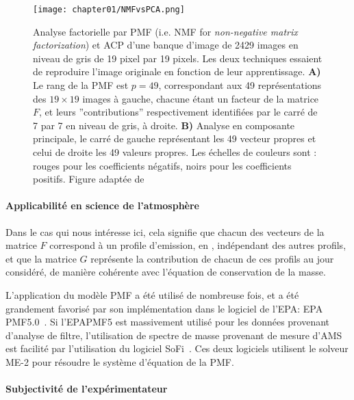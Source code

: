 \begin{figure}[ht]
    \centering
    \texttt{[image: chapter01/NMFvsPCA.png]}
    \caption{Analyse factorielle par PMF (i.e. NMF for \textit{non-negative matrix
    factorization}) et ACP d'une banque d'image de 2429 images en niveau de gris de 19
    pixel par 19 pixels. Les deux techniques essaient de reproduire l'image originale en
    fonction de leur apprentissage.
    \textbf{A)} Le rang de la PMF est $p=49$, correspondant aux 49
    représentations des $19\times19$ images à gauche, chacune étant un facteur de la
    matrice $F$, et leurs ''contributions'' respectivement identifiées par le carré de 7 par
    7 en niveau de gris, à droite.
    \textbf{B)} Analyse en composante principale, le carré de gauche représentant les 49
    vecteur propres et celui de droite les 49 valeurs propres.
    Les échelles de couleurs sont : rouges pour les coefficients négatifs, noirs pour les
    coefficients positifs.
    Figure adaptée de \textcite{leeLearning1999}}%
    \label{fig:chapter01/NMFvsPCA}
\end{figure}

\paragraph{Applicabilité en science de l'atmosphère}%
\label{par:applicabilité_en_science_de_l_atmosphère}

Dans le cas qui nous intéresse ici, cela signifie que chacun des vecteurs de la matrice
$F$ correspond à un profile d'emission, en \si{\ugm}, indépendant des autres profils, et
que la matrice $G$ représente la contribution de chacun de ces profils au jour
considéré, de manière cohérente avec l'équation de conservation de la masse.

L'application du modèle PMF a été utilisé de nombreuse fois, et a été grandement favorisé
par son implémentation dans le logiciel de l'EPA: EPA PMF5.0~\autocite{norrisEPA2014}.
Si l'EPAPMF5 est massivement utilisé pour les données provenant d'analyse de
filtre, l'utilisation de spectre de masse provenant de mesure d'AMS est facilité par
l'utilisation du logiciel SoFi~\autocite{canonacoSoFi2013}. Ces deux logiciels utilisent
le solveur ME-2 pour résoudre le système d'équation de la PMF.

\paragraph{Subjectivité de l'expérimentateur}%
\label{par:subjectivité_de_l_expérimentateur}

